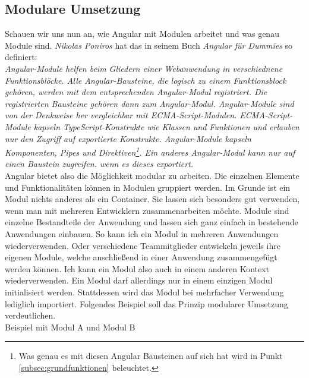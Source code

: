 \subsection{Modulare Umsetzung}
Schauen wir uns nun an, wie Angular mit Modulen arbeitet und was genau Module sind. \textit{Nikolas Poniros} hat das in seinem Buch \textit{Angular für Dummies} so definiert:\\

\textit{\glqq Angular-Module helfen beim Gliedern einer Webanwendung in verschiednene Funktionsblöcke. Alle Angular-Bausteine, die logisch zu einem Funktionsblock gehören, werden mit dem entsprechenden Angular-Modul registriert. Die registrierten Bausteine gehören dann zum Angular-Modul. Angular-Module sind von der Denkweise her vergleichbar mit ECMA-Script-Modulen. ECMA-Script-Module kapseln TypeScript-Konstrukte wie Klassen und Funktionen und erlauben nur den Zugriff auf exportierte Konstrukte. Angular-Module kapseln Komponenten, Pipes und Direktiven\footnote{Was genau es mit diesen Angular Bausteinen auf sich hat wird in Punkt \ref{subsec:grundfunktionen} beleuchtet.}. Ein anderes Angular-Modul kann nur auf einen Baustein zugreifen. wenn es dieses exportiert.\grqq \cite{poniros_angular_2019} }\\

Angular bietet also die Möglichkeit modular zu arbeiten. Die einzelnen Elemente und Funktionalitäten können in Modulen gruppiert werden. Im Grunde ist ein Modul nichts anderes als ein Container. Sie lassen sich besonders gut verwenden, wenn man mit mehreren Entwicklern zusammenarbeiten möchte. Module sind einzelne Bestandteile der Anwendung und lassen sich ganz einfach in bestehende Anwendungen einbauen. So kann ich ein Modul in mehreren Anwendungen wiederverwenden. Oder verschiedene Teammitglieder entwickeln jeweils ihre eigenen Module, welche anschließend in einer Anwendung zusammengefügt werden können. Ich kann ein Modul also auch in einem anderen Kontext wiederverwenden. Ein Modul darf allerdings nur in einem einzigen Modul initialisiert werden. Stattdessen wird das Modul bei mehrfacher Verwendung lediglich importiert. Folgendes Beispiel soll das Prinzip modularer Umsetzung verdeutlichen.\\

%
Beispiel mit Modul A und Modul B\\
%

